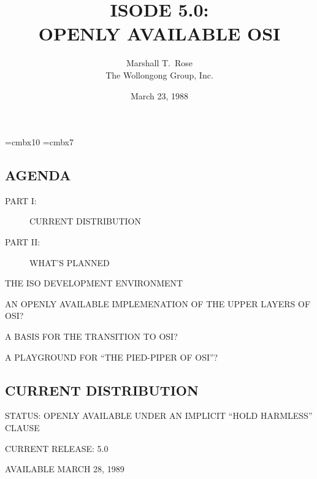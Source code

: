 

\font\xx=cmbx10
\font\yy=cmbx7

\raggedright


\let\tradeNAMfont=\relax
\let\tradeORGfont=\relax



\title	{ISODE 5.0:\\ OPENLY AVAILABLE OSI}
\author	{Marshall T.~Rose\\ The Wollongong Group, Inc.}
\date	{March 23, 1988}
\maketitlepage


\begin{bwslide}
\part*	{AGENDA}\bf

\begin{description}
\item[PART I:]		CURRENT DISTRIBUTION

\item[PART II:]		WHAT'S PLANNED
\end{description}
\end{bwslide}


\begin{bwslide}

\begin{nrtc}
\item	THE ISO DEVELOPMENT ENVIRONMENT

\item	AN OPENLY AVAILABLE IMPLEMENATION OF THE UPPER LAYERS OF OSI?

\item	A BASIS FOR THE TRANSITION TO OSI?

\item	A PLAYGROUND FOR ``THE PIED-PIPER OF OSI''?
\end{nrtc}
\end{bwslide}


\begin{bwslide}
\part	{CURRENT DISTRIBUTION}\bf

\begin{nrtc}
\item	STATUS: OPENLY AVAILABLE UNDER AN IMPLICIT ``HOLD HARMLESS'' CLAUSE

\item	CURRENT RELEASE: 5.0
    \begin{nrtc}
    \item	AVAILABLE MARCH 28, 1989
    \end{nrtc}
\end{nrtc}
\end{bwslide}


